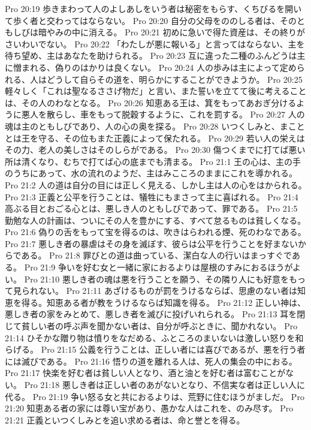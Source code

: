 Pro 20:19  歩きまわって人のよしあしをいう者は秘密をもらす、くちびるを開いて歩く者と交わってはならない。
Pro 20:20  自分の父母をののしる者は、そのともしびは暗やみの中に消える。
Pro 20:21  初めに急いで得た資産は、その終りがさいわいでない。
Pro 20:22  「わたしが悪に報いる」と言ってはならない、主を待ち望め、主はあなたを助けられる。
Pro 20:23  互に違った二種のふんどうは主に憎まれる、偽りのはかりは良くない。
Pro 20:24  人の歩みは主によって定められる、人はどうして自らその道を、明らかにすることができようか。
Pro 20:25  軽々しく「これは聖なるささげ物だ」と言い、また誓いを立てて後に考えることは、その人のわなとなる。
Pro 20:26  知恵ある王は、箕をもってあおぎ分けるように悪人を散らし、車をもって脱穀するように、これを罰する。
Pro 20:27  人の魂は主のともしびであり、人の心の奥を探る。
Pro 20:28  いつくしみと、まこととは王を守る、その位もまた正義によって保たれる。
Pro 20:29  若い人の栄えはその力、老人の美しさはそのしらがである。
Pro 20:30  傷つくまでに打てば悪い所は清くなり、むちで打てば心の底までも清まる。
Pro 21:1  王の心は、主の手のうちにあって、水の流れのようだ、主はみこころのままにこれを導かれる。
Pro 21:2  人の道は自分の目には正しく見える、しかし主は人の心をはかられる。
Pro 21:3  正義と公平を行うことは、犠牲にもまさって主に喜ばれる。
Pro 21:4  高ぶる目とおごる心とは、悪しき人のともしびであって、罪である。
Pro 21:5  勤勉な人の計画は、ついにその人を豊かにする、すべて怠るものは貧しくなる。
Pro 21:6  偽りの舌をもって宝を得るのは、吹きはらわれる煙、死のわなである。
Pro 21:7  悪しき者の暴虐はその身を滅ぼす、彼らは公平を行うことを好まないからである。
Pro 21:8  罪びとの道は曲っている、潔白な人の行いはまっすぐである。
Pro 21:9  争いを好む女と一緒に家におるよりは屋根のすみにおるほうがよい。
Pro 21:10  悪しき者の魂は悪を行うことを願う、その隣り人にも好意をもって見られない。
Pro 21:11  あざけるものが罰をうけるならば、思慮のない者は知恵を得る。知恵ある者が教をうけるならば知識を得る。
Pro 21:12  正しい神は、悪しき者の家をみとめて、悪しき者を滅びに投げいれられる。
Pro 21:13  耳を閉じて貧しい者の呼ぶ声を聞かない者は、自分が呼ぶときに、聞かれない。
Pro 21:14  ひそかな贈り物は憤りをなだめる、ふところのまいないは激しい怒りを和らげる。
Pro 21:15  公義を行うことは、正しい者には喜びであるが、悪を行う者には滅びである。
Pro 21:16  悟りの道を離れる人は、死人の集会の中におる。
Pro 21:17  快楽を好む者は貧しい人となり、酒と油とを好む者は富むことがない。
Pro 21:18  悪しき者は正しい者のあがないとなり、不信実な者は正しい人に代る。
Pro 21:19  争い怒る女と共におるよりは、荒野に住むほうがましだ。
Pro 21:20  知恵ある者の家には尊い宝があり、愚かな人はこれを、のみ尽す。
Pro 21:21  正義といつくしみとを追い求める者は、命と誉とを得る。
